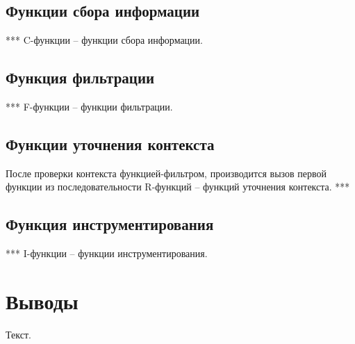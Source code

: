 \subsection{Функции сбора информации}

***
C-функции -- функции сбора информации.

\subsection{Функция фильтрации}

***
F-функции -- функции фильтрации.

\subsection{Функции уточнения контекста}

После проверки контекста функцией-фильтром, производится вызов первой функции из последовательности R-функций -- функций уточнения контекста.
***

\subsection{Функция инструментирования}

***
I-функции -- функции инструментирования.

\section{Выводы}

Текст.
